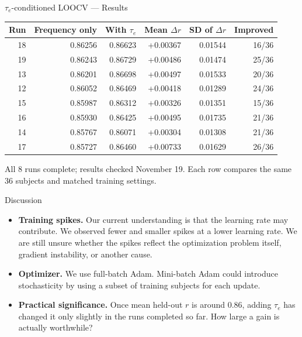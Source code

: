 \documentclass[aspectratio=169,11pt]{beamer}
\begin{document}
\begin{frame}[t]{$\tau_e$-conditioned LOOCV --- Results}
\centering\small
\begin{tabular}{rrrrrr}\toprule
Run & Frequency only & With $\tau_e$ & Mean $\Delta r$ & SD of $\Delta r$ & Improved\\\midrule
18 & 0.86256 & 0.86623 & +0.00367 & 0.01544 & 16/36\\
19 & 0.86243 & 0.86729 & +0.00486 & 0.01474 & 25/36\\
13 & 0.86201 & 0.86698 & +0.00497 & 0.01533 & 20/36\\
12 & 0.86052 & 0.86469 & +0.00418 & 0.01289 & 24/36\\
15 & 0.85987 & 0.86312 & +0.00326 & 0.01351 & 15/36\\
16 & 0.85930 & 0.86425 & +0.00495 & 0.01735 & 21/36\\
14 & 0.85767 & 0.86071 & +0.00304 & 0.01308 & 21/36\\
17 & 0.85727 & 0.86460 & +0.00733 & 0.01629 & 26/36\\\bottomrule\end{tabular}\par\vspace{0.25cm}\small All 8 runs complete; results checked November 19. Each row compares the same 36 subjects and matched training settings.
\end{frame}

\begin{frame}[t]{Discussion}
\begin{itemize}
\item \textbf{Training spikes.} Our current understanding is that the learning rate may contribute. We observed fewer and smaller spikes at a lower learning rate. We are still unsure whether the spikes reflect the optimization problem itself, gradient instability, or another cause.
\item \textbf{Optimizer.} We use full-batch Adam. Mini-batch Adam could introduce stochasticity by using a subset of training subjects for each update.
\item \textbf{Practical significance.} Once mean held-out $r$ is around $0.86$, adding $\tau_e$ has changed it only slightly in the runs completed so far. How large a gain is actually worthwhile?
\end{itemize}
\end{frame}
\end{document}
